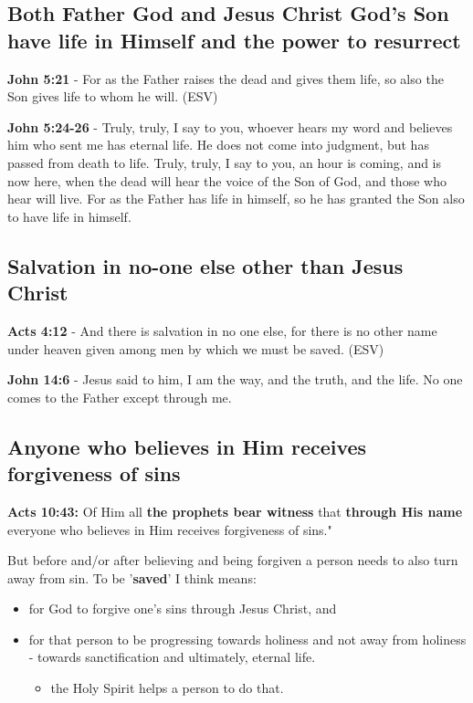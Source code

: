 \documentclass[11pt]{article}
\begin{document}
\subsection{Both Father God and Jesus Christ God's Son have life in Himself and the power to resurrect}
\label{sec:org98ad30f}
\textbf{John 5:21} - For as the Father raises the dead and gives them life, so also the Son gives life to whom he will. (ESV)

\textbf{John 5:24-26} - Truly, truly, I say to you, whoever hears my word and believes him who sent me has eternal life. He does not come into judgment, but has passed from death to life. Truly, truly, I say to you, an hour is coming, and is now here, when the dead will hear the voice of the Son of God, and those who hear will live. For as the Father has life in himself, so he has granted the Son also to have life in himself.

\subsection{Salvation in no-one else other than Jesus Christ}
\label{sec:org6badfb4}
\textbf{Acts 4:12} - And there is salvation in no one else, for there is no other name under heaven given among men by which we must be saved. (ESV)

\textbf{John 14:6} - Jesus said to him, I am the way, and the truth, and the life. No one comes to the Father except through me.

\subsection{Anyone who believes in Him receives forgiveness of sins}
\label{sec:org646777a}
\textbf{Acts 10:43:} Of Him all \textbf{the prophets bear witness} that \textbf{through His name} everyone who believes in Him receives forgiveness of sins."

But before and/or after believing and being forgiven a person needs to also turn away from sin.
To be '\textbf{saved}' I think means:
\begin{itemize}
\item for God to forgive one's sins through Jesus Christ, and
\item for that person to be progressing towards holiness and not away from holiness - towards sanctification and ultimately, eternal life.
\begin{itemize}
\item the Holy Spirit helps a person to do that.
\end{itemize}
\end{itemize}
\end{document}
